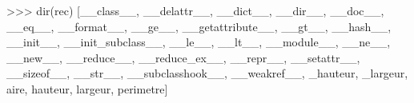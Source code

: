 \documentclass[
  a4paper,
  DIV=11,
  numbers=noendperiod]{scrartcl}
\newenvironment{Shaded}{\begin{snugshade}}{\end{snugshade}}
\newcommand{\BuiltInTok}[1]{\textcolor[rgb]{0.00,0.23,0.31}{#1}}
\newcommand{\NormalTok}[1]{\textcolor[rgb]{0.00,0.23,0.31}{#1}}
\newcommand{\OperatorTok}[1]{\textcolor[rgb]{0.37,0.37,0.37}{#1}}
\newcommand{\StringTok}[1]{\textcolor[rgb]{0.13,0.47,0.30}{#1}}
\begin{document}
\begin{Shaded}
\begin{Highlighting}[]
\OperatorTok{\textgreater{}\textgreater{}\textgreater{}} \BuiltInTok{dir}\NormalTok{(rec)}
\NormalTok{[}\StringTok{\textquotesingle{}\_\_class\_\_\textquotesingle{}}\NormalTok{,}
 \StringTok{\textquotesingle{}\_\_delattr\_\_\textquotesingle{}}\NormalTok{,}
 \StringTok{\textquotesingle{}\_\_dict\_\_\textquotesingle{}}\NormalTok{,}
 \StringTok{\textquotesingle{}\_\_dir\_\_\textquotesingle{}}\NormalTok{,}
 \StringTok{\textquotesingle{}\_\_doc\_\_\textquotesingle{}}\NormalTok{,}
 \StringTok{\textquotesingle{}\_\_eq\_\_\textquotesingle{}}\NormalTok{,}
 \StringTok{\textquotesingle{}\_\_format\_\_\textquotesingle{}}\NormalTok{,}
 \StringTok{\textquotesingle{}\_\_ge\_\_\textquotesingle{}}\NormalTok{,}
 \StringTok{\textquotesingle{}\_\_getattribute\_\_\textquotesingle{}}\NormalTok{,}
 \StringTok{\textquotesingle{}\_\_gt\_\_\textquotesingle{}}\NormalTok{,}
 \StringTok{\textquotesingle{}\_\_hash\_\_\textquotesingle{}}\NormalTok{,}
 \StringTok{\textquotesingle{}\_\_init\_\_\textquotesingle{}}\NormalTok{,}
 \StringTok{\textquotesingle{}\_\_init\_subclass\_\_\textquotesingle{}}\NormalTok{,}
 \StringTok{\textquotesingle{}\_\_le\_\_\textquotesingle{}}\NormalTok{,}
 \StringTok{\textquotesingle{}\_\_lt\_\_\textquotesingle{}}\NormalTok{,}
 \StringTok{\textquotesingle{}\_\_module\_\_\textquotesingle{}}\NormalTok{,}
 \StringTok{\textquotesingle{}\_\_ne\_\_\textquotesingle{}}\NormalTok{,}
 \StringTok{\textquotesingle{}\_\_new\_\_\textquotesingle{}}\NormalTok{,}
 \StringTok{\textquotesingle{}\_\_reduce\_\_\textquotesingle{}}\NormalTok{,}
 \StringTok{\textquotesingle{}\_\_reduce\_ex\_\_\textquotesingle{}}\NormalTok{,}
 \StringTok{\textquotesingle{}\_\_repr\_\_\textquotesingle{}}\NormalTok{,}
 \StringTok{\textquotesingle{}\_\_setattr\_\_\textquotesingle{}}\NormalTok{,}
 \StringTok{\textquotesingle{}\_\_sizeof\_\_\textquotesingle{}}\NormalTok{,}
 \StringTok{\textquotesingle{}\_\_str\_\_\textquotesingle{}}\NormalTok{,}
 \StringTok{\textquotesingle{}\_\_subclasshook\_\_\textquotesingle{}}\NormalTok{,}
 \StringTok{\textquotesingle{}\_\_weakref\_\_\textquotesingle{}}\NormalTok{,}
 \StringTok{\textquotesingle{}\_hauteur\textquotesingle{}}\NormalTok{,}
 \StringTok{\textquotesingle{}\_largeur\textquotesingle{}}\NormalTok{,}
 \StringTok{\textquotesingle{}aire\textquotesingle{}}\NormalTok{,}
 \StringTok{\textquotesingle{}hauteur\textquotesingle{}}\NormalTok{,}
 \StringTok{\textquotesingle{}largeur\textquotesingle{}}\NormalTok{,}
 \StringTok{\textquotesingle{}perimetre\textquotesingle{}}\NormalTok{]}
\end{Highlighting}
\end{Shaded}
\end{document}

